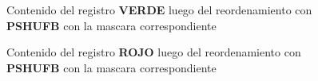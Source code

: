 \begin{itemize}
      \par      
      \bigskip
       \begin{figure}[!ht]
        \centering
        \caption{Contenido del registro \textbf{VERDE} luego del reordenamiento con \textbf{PSHUFB} con la mascara correspondiente}
      \end{figure}

      \par      
      \bigskip
       \begin{figure}[!ht]
        \centering
        \caption{Contenido del registro \textbf{ROJO} luego del reordenamiento con \textbf{PSHUFB} con la mascara correspondiente}
      \end{figure}
      \newpage



\end{itemize}
